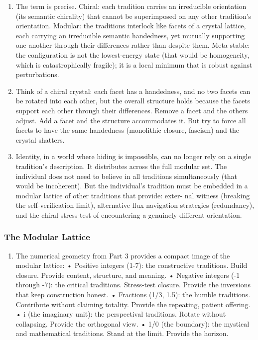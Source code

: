\documentclass[
]{article}
\providecommand{\tightlist}{%
  \setlength{\itemsep}{0pt}\setlength{\parskip}{0pt}}
\begin{document}
\begin{enumerate}
\def\labelenumi{\arabic{enumi}.}
\setcounter{enumi}{203}
\item
  The term is precise. Chiral: each tradition carries an irreducible
  orientation (its semantic chirality) that cannot be superimposed on
  any other tradition's orientation. Modular: the traditions interlock
  like facets of a crystal lattice, each carrying an irreducible
  semantic handedness, yet mutually supporting one another through their
  differences rather than despite them. Meta-stable: the configuration
  is not the lowest-energy state (that would be homogeneity, which is
  catastrophically fragile); it is a local minimum that is robust
  against perturbations.
\item
  Think of a chiral crystal: each facet has a handedness, and no two
  facets can be rotated into each other, but the overall structure holds
  because the facets support each other through their differences.
  Remove a facet and the others adjust. Add a facet and the structure
  accommodates it. But try to force all facets to have the same
  handedness (monolithic closure, fascism) and the crystal shatters.
\item
  Identity, in a world where hiding is impossible, can no longer rely on
  a single tradition's description. It distributes across the full
  modular set. The individual does not need to believe in all traditions
  simultaneously (that would be incoherent). But the individual's
  tradition must be embedded in a modular lattice of other traditions
  that provide: exter- nal witness (breaking the self-verification
  limit), alternative flux navigation strategies (redundancy), and the
  chiral stress-test of encountering a genuinely different orientation.
\end{enumerate}

\subsubsection{The Modular Lattice}\label{the-modular-lattice}

\begin{enumerate}
\def\labelenumi{\arabic{enumi}.}
\setcounter{enumi}{206}
\tightlist
\item
  The numerical geometry from Part 3 provides a compact image of the
  modular lattice: • Positive integers (1-7): the constructive
  traditions. Build closure. Provide content, structure, and meaning. •
  Negative integers (-1 through -7): the critical traditions.
  Stress-test closure. Provide the inversions that keep construction
  honest. • Fractions (1/3, 1.5): the humble traditions. Contribute
  without claiming totality. Provide the repeating, patient offering. •
  i (the imaginary unit): the perspectival traditions. Rotate without
  collapsing. Provide the orthogonal view. • 1/0 (the boundary): the
  mystical and mathematical traditions. Stand at the limit. Provide the
  horizon.
\end{enumerate}
\end{document}
